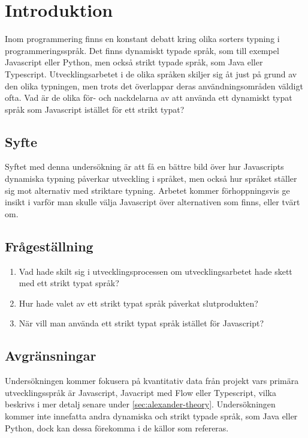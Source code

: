 \section{Introduktion}
\label{sec:alexander-introduction}
Inom programmering finns en konstant debatt kring olika sorters typning i programmeringsspråk. Det finns dynamiskt typade språk, som till exempel Javascript eller Python, men också strikt typade språk, som Java eller Typescript. Utvecklingsarbetet i de olika språken skiljer sig åt just på grund av den olika typningen, men trots det överlappar deras användningsområden väldigt ofta. Vad är de olika för- och nackdelarna av att använda ett dynamiskt typat språk som Javascript istället för ett strikt typat?

\subsection{Syfte}
\label{subsec:motivation}

Syftet med denna undersökning är att få en bättre bild över hur Javascripts dynamiska typning påverkar utveckling i språket, men också hur språket ställer sig mot alternativ med striktare typning. Arbetet kommer förhoppningsvis ge insikt i varför man skulle välja Javascript över alternativen som finns, eller tvärt om.

\subsection{Frågeställning}
\label{subsec:research-questions}

\begin{enumerate}
\item\label{alexander-fs:1} Vad hade skilt sig i utvecklingsprocessen om utvecklingsarbetet hade skett med ett strikt typat språk?

\item\label{alexander-fs:2} Hur hade valet av ett strikt typat språk påverkat slutprodukten?

\item\label{alexander-fs:3} När vill man använda ett strikt typat språk istället för Javascript?

\end{enumerate}


\subsection{Avgränsningar}
\label{subsec:delimitations}

Undersökningen kommer fokusera på kvantitativ data från projekt vars primära utvecklingsspråk är Javascript, Javacript med Flow eller Typescript, vilka beskrivs i mer detalj senare under \ref{sec:alexander-theory}. Undersökningen kommer inte innefatta andra dynamiska och strikt typade språk, som Java eller Python, dock kan dessa förekomma i de källor som refereras.





